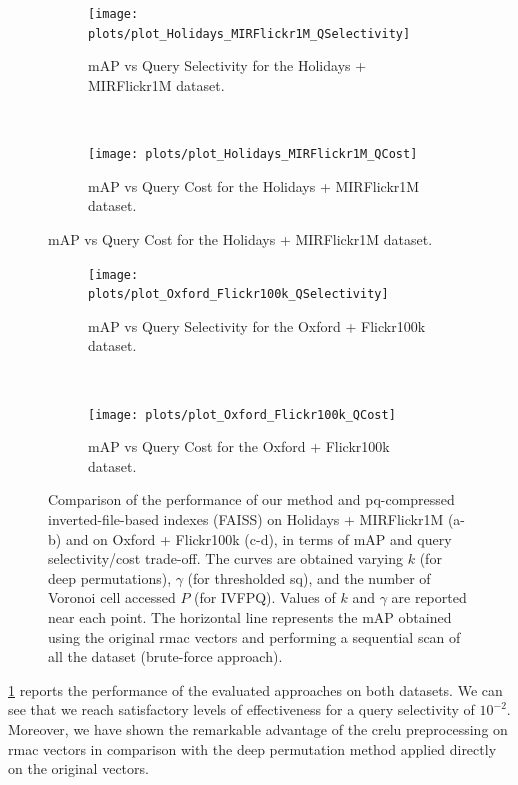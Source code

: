 \begin{figure}

\begin{subfigure}{\linewidth}
\centering
\caption{\centering mAP vs Query Selectivity for the Holidays + MIRFlickr1M dataset.}%
\texttt{[image: plots/plot\_Holidays\_MIRFlickr1M\_QSelectivity]}
\end{subfigure}\\[4ex]
\begin{subfigure}{\linewidth}
\centering
\caption{\centering mAP vs Query Cost for the Holidays + MIRFlickr1M dataset.}%
\texttt{[image: plots/plot\_Holidays\_MIRFlickr1M\_QCost]}
\end{subfigure}
\end{figure}%
%
\begin{figure}
\ContinuedFloat
\begin{subfigure}{\linewidth}
\centering
\caption{\centering mAP vs Query Selectivity for the Oxford + Flickr100k dataset.}%
\texttt{[image: plots/plot\_Oxford\_Flickr100k\_QSelectivity]}
\end{subfigure}\\[4ex]
\begin{subfigure}{\linewidth}
\centering
\caption{\centering mAP vs Query Cost for the Oxford + Flickr100k dataset.}%
\texttt{[image: plots/plot\_Oxford\_Flickr100k\_QCost]}
\end{subfigure}

\caption{Comparison of the performance of our method and \gls{pq}-compressed inverted-file-based indexes (FAISS) on Holidays + MIRFlickr1M (a-b) and on Oxford + Flickr100k (c-d), in terms of mAP and query selectivity/cost trade-off.
The curves are obtained varying $k$ (for deep permutations), $\gamma$ (for thresholded \gls{sq}), and the number of Voronoi cell accessed $P$ (for IVFPQ).
Values of $k$ and $\gamma$ are reported near each point.
The horizontal line represents the \gls{mAP} obtained using the original \gls{rmac} vectors and performing a sequential scan of all the dataset (brute-force approach).
}
\label{fig:str:results}
\end{figure}

\ref{fig:str:results} reports the performance of the evaluated approaches on both datasets.
We can see that we reach satisfactory levels of effectiveness for a query selectivity of $10^{-2}$.
Moreover, we have shown the remarkable advantage of the \gls{crelu} preprocessing on \gls{rmac} vectors in comparison with the deep permutation method applied directly on the original vectors.

